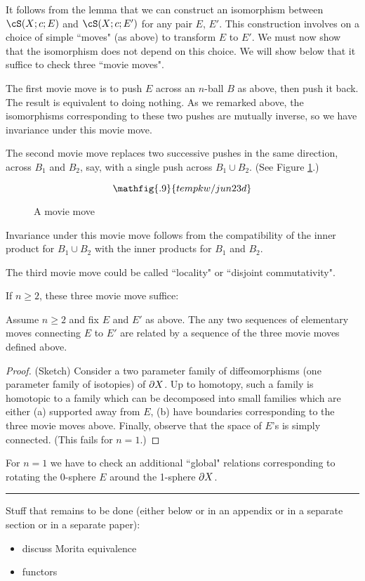 It follows from the lemma that we can construct an isomorphism
between $\cS(X; c; E)$ and $\cS(X; c; E')$ for any pair $E$, $E'$.
This construction involves on a choice of simple ``moves" (as above) to transform
$E$ to $E'$.
We must now show that the isomorphism does not depend on this choice.
We will show below that it suffice to check three ``movie moves".

The first movie move is to push $E$ across an $n$-ball $B$ as above, then push it back.
The result is equivalent to doing nothing.
As we remarked above, the isomorphisms corresponding to these two pushes are mutually
inverse, so we have invariance under this movie move.

The second movie move replaces two successive pushes in the same direction,
across $B_1$ and $B_2$, say, with a single push across $B_1\cup B_2$.
(See Figure \ref{jun23d}.)
\begin{figure}[t]
\begin{equation*}
\mathfig{.9}{tempkw/jun23d}
\end{equation*}
\caption{A movie move}
\label{jun23d}
\end{figure}
Invariance under this movie move follows from the compatibility of the inner
product for $B_1\cup B_2$ with the inner products for $B_1$ and $B_2$.

The third movie move could be called ``locality" or ``disjoint commutativity".

If $n\ge 2$, these three movie move suffice:

\begin{lem}
Assume $n\ge 2$ and fix $E$ and $E'$ as above.
The any two sequences of elementary moves connecting $E$ to $E'$
are related by a sequence of the three movie moves defined above.
\end{lem}

\begin{proof}
(Sketch)
Consider a two parameter family of diffeomorphisms (one parameter family of isotopies) 
of $\partial X$.
Up to homotopy,
such a family is homotopic to a family which can be decomposed 
into small families which are either
(a) supported away from $E$, 
(b) have boundaries corresponding to the three movie moves above.
Finally, observe that the space of $E$'s is simply connected.
(This fails for $n=1$.)
\end{proof}

For $n=1$ we have to check an additional ``global" relations corresponding to 
rotating the 0-sphere $E$ around the 1-sphere $\partial X$.


\medskip
\hrule
\medskip

\medskip






Stuff that remains to be done (either below or in an appendix or in a separate section or in
a separate paper):
\begin{itemize}
\item discuss Morita equivalence
\item functors
\end{itemize}



